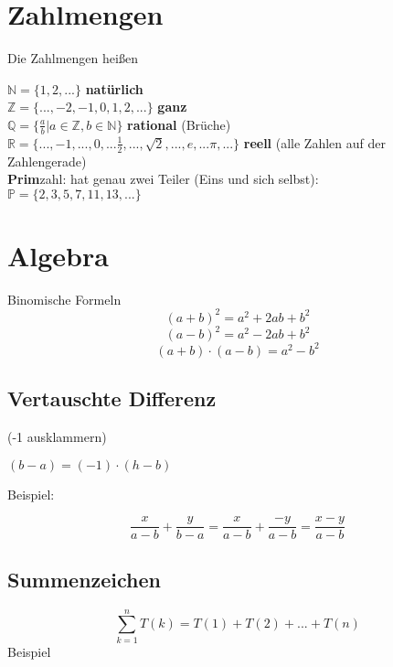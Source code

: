 \begin{multicols}{2}%

\section*{Zahlmengen}
\begin{definition*}{}{}
Die Zahlmengen heißen

$\mathbb{N} = \{1,2, ...\}$                                   \textbf{natürlich}\\
$\mathbb{Z} = \{..., -2, -1, 0, 1,2, ...\}$                   \textbf{ganz}\\
$\mathbb{Q} = \{\frac{a}b|a\in \mathbb{Z},b\in\mathbb{N}\}$   \textbf{rational} (Brüche)\\
$\mathbb{R} = \{..., -1, ..., 0, ... \frac12, ..., \sqrt{2}, ..., e, ... \pi, ...\}  $ \textbf{reell} (alle Zahlen auf der Zahlengerade)\\

\textbf{Prim}zahl: hat genau zwei Teiler (Eins und sich selbst):\\ $\mathbb{P} = \{2, 3, 5, 7, 11, 13, ...\}$
\end{definition*}

\hrulefill%

\section*{Algebra}

\begin{gesetz*}{Binomische Formeln}{}
$$(a+b)^2 = a^2+2ab + b^2$$
$$(a-b)^2=a^2-2ab+b^2$$
$$(a+b)\cdot(a-b) = a^2 - b^2$$
\end{gesetz*}

\subsection*{Vertauschte Differenz}
(-1 ausklammern)

$(b-a)=(-1)\cdot{}(h-b)$

Beispiel:

$$\frac{x}{a-b} +  \frac{y}{b-a} = \frac{x}{a-b} + \frac{-y}{a-b} = \frac{x-y}{a-b}$$

\forceCB
\subsection*{Summenzeichen}
$$\sum_{k=1}^n{T(k)} = T(1) + T(2) + ... + T(n)$$
Beispiel


\end{multicols}
